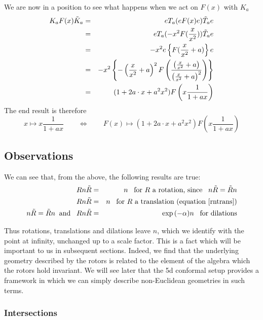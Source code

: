 %
We are now in a position to see what happens when we act
on $F(x)$ with $K_a$
%
\begin{eqnarray}
 K_a F(x) \tilde{K}_a & = & eT_a(eF(x)e)\tilde{T}_a e \nonumber \\
               & = & eT_a( - x^2 F(\frac{x}{x^2}))\tilde{T}_a e \nonumber \\
       & = &  -x^2 e\left\{ F(\frac{x}{x^2} +a)\right\} e \nonumber \\
& = & -x^2\left\{- \left(\frac{x}{x^2} + a\right)^2
F\left(\frac{\left(
\frac{x}{x^2} + a\right)}{\left(\frac{x}{x^2} + a\right)^2}\right)\right\} \nonumber \\
          & = & (1 + 2a\cdot x + a^2x^2)F\left( x\frac{1}{1+ax}\right)
\end{eqnarray}
%
The end result is therefore
%
\begin{equation}
x\mapsto x\frac{1}{1+ax}  \qquad \Leftrightarrow \qquad  F(x)
\mapsto (1+2a\cdot x + a^2x^2)F\left(x\frac{1}{1+ax}\right)
\end{equation}
%

%
\subsection{Observations}
We can see that, from the above, the following results are true:
%
\begin{eqnarray}
R n \tilde{R} &  =  &   n \;\;\; \mbox{for $R$ a
rotation, since} \;\;\; n\tilde{R}=\tilde{R}n
 \nonumber \\
 R n \tilde{R} &  =  &   n \;\;\; \mbox{for $R$ a
translation (equation~\ref{rntrans}}) \nonumber \\
n\tilde{R}=\tilde{R}n \;\;\mbox{and}\;\;\; R n \tilde{R}
& = & \exp{(-\alpha )}n \;\;\;\mbox{for dilations} \nonumber
\end{eqnarray}
%

Thus rotations, translations and dilations leave $n$, which we identify with
the point at infinity, unchanged up to a scale factor. This is a fact which
will be important to us in subsequent sections. Indeed, we find that the
underlying geometry described by the rotors is related to the element of the
algebra which the rotors hold invariant. We will see later that the 5d
conformal setup provides a framework in which we can simply describe
non-Euclidean geometries in such terms.


\subsubsection{Intersections}


